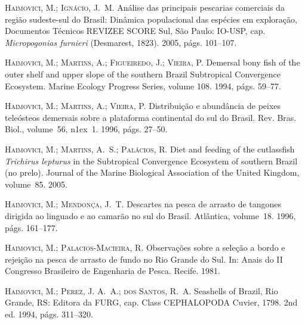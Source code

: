 \documentclass[a4paper,11pt,twoside,showtrims,onecolumn,openright,final]{memoir}
\begin{document}
\begin{thebibliography}{194}
\textsc{Haimovici, M.; Ign\'acio, J.~M.}
\newblock An\'alise das principais pescarias comerciais da regi\~ao sudeste-sul
  do {B}rasil: {D}in\^amica populacional das esp\'ecies em explora\c{c}\~ao,
  Documentos T\'ecnicos REVIZEE SCORE Sul, S\~ao Paulo: IO-USP, cap.
  \emph{Micropogonias furnieri} (Desmarest, 1823). 2005, p\'ags. 101--107.

\textsc{Haimovici, M.; Martins, A.; Figueiredo, J.; Vieira, P.}
\newblock Demersal bony fish of the outer shelf and upper slope of the southern
  {B}razil {S}ubtropical {C}onvergence {E}cosystem.
\newblock Marine Ecology Progress Series, volume 108. 1994{},
  p\'ags. 59--77.

\textsc{Haimovici, M.; Martins, A.; Vieira, P.}
\newblock Distribui\c{c}\~ao e abund\^ancia de peixes tele\'osteos demersais
  sobre a plataforma continental do sul do {B}rasil.
\newblock Rev. Bras. Biol., volume~56, n\raise1ex\hbox{}~1. 1996, p\'ags. 27--50.

\textsc{Haimovici, M.; Martins, A.~S.; Pal\'acios, R.}
\newblock Diet and feeding of the cutlassfish \emph{{T}richirus lepturus} in the
  {S}ubtropical {C}onvergence {E}cosystem of southern {B}razil (no prelo).
\newblock Journal of the Marine Biological Association of the United Kingdom,
  volume~85. 2005.

\textsc{Haimovici, M.; Mendon\c{c}a, J.~T.}
\newblock Descartes na pesca de arrasto de tangones dirigida ao linguado e ao
  camar\~ao no sul do {B}rasil.
\newblock Atl\^antica, volume~18. 1996, p\'ags. 161--177.

\textsc{Haimovici, M.; Palacios-Macieira, R.}
\newblock Observa\c{c}\~oes sobre a sele\c{c}\~ao a bordo e rejei\c{c}\~ao na
  pesca de arrasto de fundo no {R}io {G}rande do {S}ul.
\newblock In: Anais do {II} {C}ongresso {B}rasileiro de {E}ngenharia de
  {P}esca. Recife. 1981.

\textsc{Haimovici, M.; Perez, J. A.~A.; dos Santos, R.~A.}
\newblock Seashells of Brazil, Rio Grande, RS: Editora da FURG, cap. Class
  CEPHALOPODA Cuvier, 1798.
\newblock 2nd ed. 1994{}, p\'ags. 311--320.


\end{thebibliography}
\end{document}
